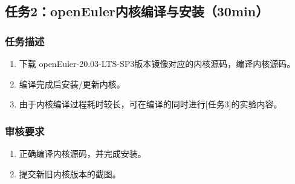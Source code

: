 \documentclass{article}
\begin{document}
\subsection{任务2：openEuler内核编译与安装（30min）}
\subsubsection{任务描述}
\begin{enumerate}
	\item 下载 openEuler-20.03-LTS-SP3版本镜像对应的内核源码，编译内核源码。
	\item 编译完成后安装/更新内核。
	\item 由于内核编译过程耗时较长，可在编译的同时进行[任务3]的实验内容。
\end{enumerate}
\subsubsection{审核要求}
\begin{enumerate}
	\item 正确编译内核源码，并完成安装。
	\item 提交新旧内核版本的截图。
\end{enumerate}
\end{document}
